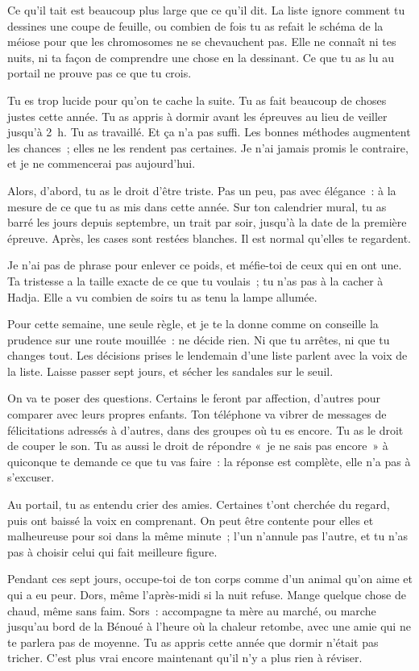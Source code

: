 \documentclass[10.5pt,twoside,openright]{book}
\begin{document}
Ce qu’il tait est beaucoup plus large que ce qu’il dit. La liste ignore comment tu dessines une coupe de feuille, ou combien de fois tu as refait le schéma de la méiose pour que les chromosomes ne se chevauchent pas. Elle ne connaît ni tes nuits, ni ta façon de comprendre une chose en la dessinant. Ce que tu as lu au portail ne prouve pas ce que tu crois.

Tu es trop lucide pour qu’on te cache la suite. Tu as fait beaucoup de choses justes cette année. Tu as appris à dormir avant les épreuves au lieu de veiller jusqu’à 2 h. Tu as travaillé. Et ça n’a pas suffi. Les bonnes méthodes augmentent les chances ; elles ne les rendent pas certaines. Je n’ai jamais promis le contraire, et je ne commencerai pas aujourd’hui.

Alors, d’abord, tu as le droit d’être triste. Pas un peu, pas avec élégance : à la mesure de ce que tu as mis dans cette année. Sur ton calendrier mural, tu as barré les jours depuis septembre, un trait par soir, jusqu’à la date de la première épreuve. Après, les cases sont restées blanches. Il est normal qu’elles te regardent.

Je n’ai pas de phrase pour enlever ce poids, et méfie-toi de ceux qui en ont une. Ta tristesse a la taille exacte de ce que tu voulais ; tu n’as pas à la cacher à Hadja. Elle a vu combien de soirs tu as tenu la lampe allumée.

Pour cette semaine, une seule règle, et je te la donne comme on conseille la prudence sur une route mouillée : ne décide rien. Ni que tu arrêtes, ni que tu changes tout. Les décisions prises le lendemain d’une liste parlent avec la voix de la liste. Laisse passer sept jours, et sécher les sandales sur le seuil.

On va te poser des questions. Certains le feront par affection, d’autres pour comparer avec leurs propres enfants. Ton téléphone va vibrer de messages de félicitations adressés à d’autres, dans des groupes où tu es encore. Tu as le droit de couper le son. Tu as aussi le droit de répondre « je ne sais pas encore » à quiconque te demande ce que tu vas faire : la réponse est complète, elle n’a pas à s’excuser.

Au portail, tu as entendu crier des amies. Certaines t’ont cherchée du regard, puis ont baissé la voix en comprenant. On peut être contente pour elles et malheureuse pour soi dans la même minute ; l’un n’annule pas l’autre, et tu n’as pas à choisir celui qui fait meilleure figure.

Pendant ces sept jours, occupe-toi de ton corps comme d’un animal qu’on aime et qui a eu peur. Dors, même l’après-midi si la nuit refuse. Mange quelque chose de chaud, même sans faim. Sors : accompagne ta mère au marché, ou marche jusqu’au bord de la Bénoué à l’heure où la chaleur retombe, avec une amie qui ne te parlera pas de moyenne. Tu as appris cette année que dormir n’était pas tricher. C’est plus vrai encore maintenant qu’il n’y a plus rien à réviser.
\end{document}
